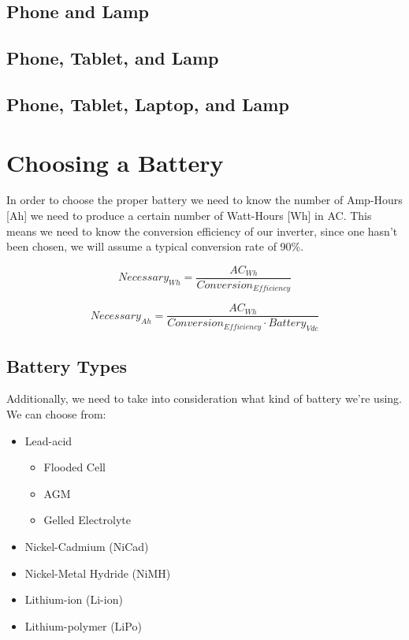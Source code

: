 \documentclass[
10pt, %
letterpaper, %
oneside, %
headinclude,footinclude, %
BCOR5mm, %
]{scrartcl}
\begin{document}
\subsection{Phone and Lamp}




\subsection{Phone, Tablet, and Lamp}


\subsection{Phone, Tablet, Laptop, and Lamp}



\section{Choosing a Battery}

In order to choose the proper battery we need to know the number of Amp-Hours [Ah] we need to produce a certain number of Watt-Hours [Wh] in AC. This means we need to know the conversion efficiency of our inverter, since one hasn't been chosen, we will assume a typical conversion rate of 90\%.

\begin{equation}
Necessary_{Wh} = \frac{AC_{Wh}}{Conversion_{Efficiency}}
\label{eq:1}
\end{equation}

\begin{equation}
Necessary_{Ah} = \frac{AC_{Wh}}{Conversion_{Efficiency} \cdot Battery_{Vdc}}
\label{eq:2}
\end{equation}

\subsection{Battery Types}
Additionally, we need to take into consideration what kind of battery we're using. We can choose from:
\begin{itemize}[noitemsep]
\item Lead-acid
	\begin{itemize}
	\item Flooded Cell
	\item AGM
	\item Gelled Electrolyte
	\end{itemize}
\item Nickel-Cadmium (NiCad)
\item Nickel-Metal Hydride (NiMH) 
\item Lithium-ion (Li-ion)
\item Lithium-polymer (LiPo)
\end{itemize}
\end{document}
